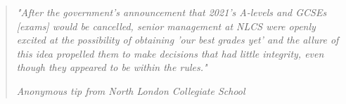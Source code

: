 \begin{quote}
    \emph{"After the government's announcement that 2021's A-levels and GCSEs [exams] would be cancelled, senior management at NLCS were openly excited at the possibility of obtaining 'our best grades yet' and the allure of this idea propelled them to make decisions that had little integrity, even though they appeared to be within the rules."}
    \vspace{-9pt} %
    \begin{flushright}
        \textit{Anonymous tip from North London Collegiate School}
    \end{flushright}
\end{quote}
